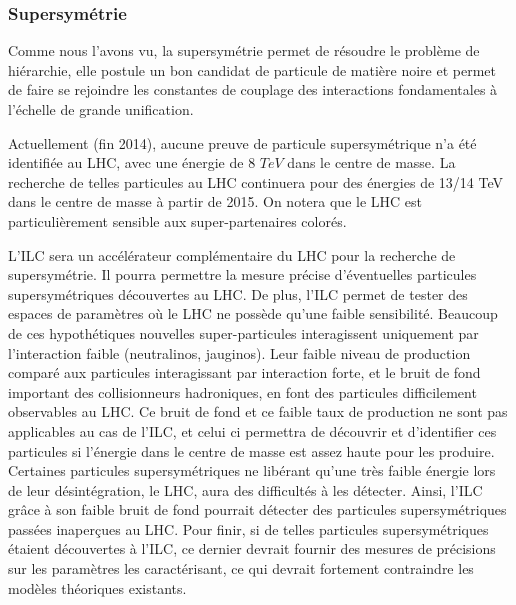    \subsubsection{Supersym\'etrie}
   
   Comme nous l'avons vu, la supersymétrie permet de r\'esoudre le probl\`eme de hi\'erarchie, elle postule un bon candidat de particule de mati\`ere noire et permet de faire se rejoindre les constantes de couplage des interactions fondamentales \`a l'\'echelle de grande unification.
   
   \medskip
   
   Actuellement (fin 2014), aucune preuve de particule supersym\'etrique n'a été identifiée au LHC, avec une \'energie de 8 $TeV$ dans le centre de masse. La recherche de telles particules au LHC continuera pour des \'energies de 13/14 TeV dans le centre de masse \`a partir de 2015. On notera que le LHC est particuli\`erement sensible aux super-partenaires color\'es.
   
   \medskip
   
   L'ILC sera un acc\'el\'erateur compl\'ementaire du LHC pour la recherche de supersymétrie. Il pourra permettre la mesure pr\'ecise d'\'eventuelles particules supersym\'etriques d\'ecouvertes au LHC. De plus, l'ILC permet de tester des espaces de param\`etres o\`u le LHC ne poss\`ede qu'une faible sensibilit\'e. Beaucoup de ces hypoth\'etiques nouvelles super-particules interagissent uniquement par l'interaction faible (neutralinos, jauginos). Leur faible niveau de production compar\'e aux particules interagissant par interaction forte, et le bruit de fond important des collisionneurs hadroniques, en font des particules difficilement observables au LHC. Ce bruit de fond et ce faible taux de production ne sont pas applicables au cas de l'ILC, et celui ci permettra de d\'ecouvrir et d'identifier ces particules si l'\'energie dans le centre de masse est assez haute pour les produire. Certaines particules supersym\'etriques ne lib\'erant qu'une tr\`es faible \'energie lors de leur d\'esint\'egration, le LHC, aura des difficult\'es \`a les d\'etecter. Ainsi, l'ILC gr\^ace \`a son faible bruit de fond pourrait d\'etecter des particules supersym\'etriques pass\'ees inaperçues au LHC. Pour finir, si de telles particules supersym\'etriques \'etaient d\'ecouvertes \`a l'ILC, ce dernier devrait fournir des mesures de pr\'ecisions sur les param\`etres les caract\'erisant, ce qui devrait fortement contraindre les mod\`eles th\'eoriques existants.

